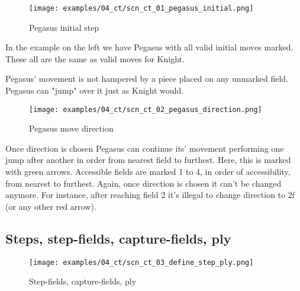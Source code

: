 \noindent
\begin{wrapfigure}[15]{l}{0.5\textwidth}
\centering
\texttt{[image: examples/04\_ct/scn\_ct\_01\_pegasus\_initial.png]}
\caption{Pegasus initial step}
\label{fig:scn_ct_01_pegasus_initial}
\end{wrapfigure}
In the example on the left we have Pegasus with all valid initial moves marked.
These all are the same as valid moves for Knight.

Pegasus' movement is not hampered by a piece placed on any unmarked field.
Pegasus can "jump" over it just as Knight would.

\clearpage %

\noindent
\begin{figure}[!h]
\texttt{[image: examples/04\_ct/scn\_ct\_02\_pegasus\_direction.png]}
\caption{Pegasus move direction}
\label{fig:scn_ct_02_pegasus_direction}
\end{figure}

Once direction is chosen Pegasus can continue its' movement performing one jump
after another in order from nearest field to furthest. Here, this is marked
with green arrows. Accessible fields are marked 1 to 4, in order of accessibility,
from nearest to furthest. Again, once direction is chosen it can't be changed anymore.
For instance, after reaching field 2 it's illegal to change direction to 2f (or
any other red arrow).

\clearpage %

\subsection*{Steps, step-fields, capture-fields, ply}

\noindent
\begin{figure}[!h]
\vspace{-1.0\baselineskip}
\texttt{[image: examples/04\_ct/scn\_ct\_03\_define\_step\_ply.png]}
\caption{Step-fields, capture-fields, ply}
\label{fig:scn_ct_03_define_step_ply}
\end{figure}

